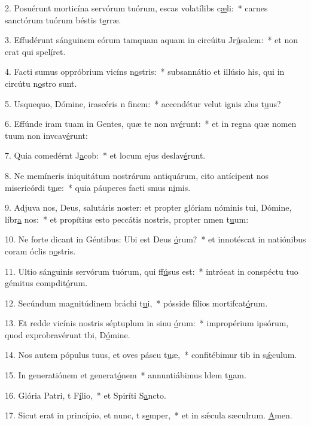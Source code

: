2. Posuérunt morticína servórum tuórum, escas volatílibs c\uline{æ}li:~* carnes sanctórum tuórum béstis t\uline{e}rræ.\par 
3. Effudérunt sánguinem eórum tamquam aquam in circúitu Jr\uline{ú}salem:~* et non erat qui spel\uline{í}ret.\par 
4. Facti sumus oppróbrium vicíns n\uline{o}stris:~* subsannátio et illúsio his, qui in circútu n\uline{o}stro sunt.\par 
5. Usquequo, Dómine, irascéris n f\uline{i}nem:~* accendétur velut ignis zlus t\uline{u}us?\par 
6. Effúnde iram tuam in Gentes, quæ te non nv\uline{é}runt:~* et in regna quæ nomen tuum non invcav\uline{é}runt:\par 
7. Quia comedérnt J\uline{a}cob:~* et locum ejus deslav\uline{é}runt.\par 
8. Ne memíneris iniquitátum nostrárum antiquárum, cito antícipent nos misericórdi t\uline{u}æ:~* quia páuperes facti smus n\uline{i}mis.\par 
9. Adjuva nos, Deus, salutáris noster: et propter glóriam nóminis tui, Dómine, líbr\uline{a} nos:~* et propítius esto peccátis nostris, propter nmen t\uline{u}um:\par 
10. Ne forte dicant in Géntibus: Ubi est Deus \uline{ó}rum?~* et innotéscat in natiónibus coram óclis n\uline{o}stris.\par 
11. Ultio sánguinis servórum tuórum, qui ff\uline{ú}sus est:~* intróeat in conspéctu tuo gémitus compdit\uline{ó}rum.\par 
12. Secúndum magnitúdinem bráchi t\uline{u}i,~* pósside fílios mortifcat\uline{ó}rum.\par 
13. Et redde vicínis nostris séptuplum in sinu \uline{ó}rum:~* impropérium ipsórum, quod exprobravérunt tbi, D\uline{ó}mine.\par 
14. Nos autem pópulus tuus, et oves páscu t\uline{u}æ,~* confitébimur tib in s\uline{ǽ}culum.\par 
15. In generatiónem et generat\uline{ó}nem~* annuntiábimus ldem t\uline{u}am.\par 
16. Glória Patri, t F\uline{í}lio,~* et Spiríti S\uline{a}ncto.\par 
17. Sicut erat in princípio, et nunc, t s\uline{e}mper,~* et in sǽcula sæculrum. \uline{A}men.\par 
